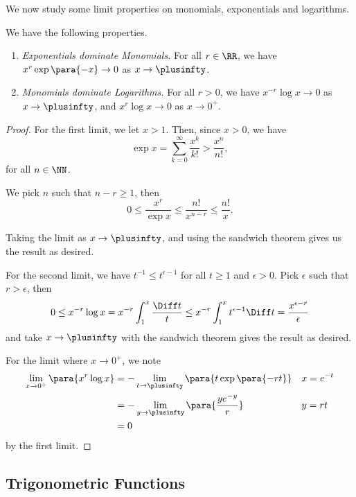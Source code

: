 We now study some limit properties on monomials, exponentials and logarithms.

\begin{proposition}
    \label{prop:lim-prop-monomial-exponential-logarithm}%
    We have the following properties.
    \begin{enumerate}
        \item \emph{Exponentials dominate Monomials.} For all \(r \in \RR\), we have \(x^r \exp\para{-x} \to 0\) as \(x \to \plusinfty\).
        \item \emph{Monomials dominate Logarithms.} For all \(r > 0\), we have \(x^{-r} \log x \to 0\) as \(x \to \plusinfty\), and \(x^r \log x \to 0\) as \(x \to 0^+\).
    \end{enumerate}
\end{proposition}

\begin{proof}
    For the first limit, we let \(x > 1\). Then, since \(x > 0\), we have
    \[
        \exp x = \sum_{k = 0}^{\infty} \frac{x^k}{k!} > \frac{x^n}{n!},
    \]  
    for all \(n \in \NN\).

    We pick \(n\) such that \(n - r \geq 1\), then
    \[
        0 \leq \frac{x^r}{\exp x} \leq \frac{n!}{x^{n - r}} \leq \frac{n!}{x}.
    \]

    Taking the limit as \(x \to \plusinfty\), and using the sandwich theorem gives us the result as desired.

    For the second limit, we have \(t^{-1} \leq t^{\epsilon - 1}\) for all \(t \geq 1\) and \(\epsilon > 0\). Pick \(\epsilon\) such that \(r > \epsilon\), then
    \[
        0 \leq x^{-r} \log x = x^{-r} \int_{1}^{x} \frac{\Diff t}{t} \leq x^{-r} \int_{1}^{x} t^{\epsilon - 1} \Diff t = \frac{x^{\epsilon - r}}{\epsilon}
    \]
    and take \(x \to \plusinfty\) with the sandwich theorem gives the result as desired.

    For the limit where \(x \to 0^+\), we note
    \begin{align*}
        \lim_{x \to 0^+} \para{x^r \log x} &= - \lim_{t \to \plusinfty} \para{t \exp \para{- rt}} && x = e^{-t} \\
        &= - \lim_{y \to \plusinfty} \para{\frac{y e^{-y}}{r}} && y = rt \\
        &= 0
    \end{align*}
    by the first limit.
\end{proof}

\subsection{Trigonometric Functions}

